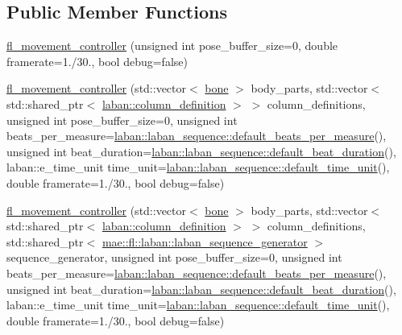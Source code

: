 \subsection*{Public Member Functions}
\begin{DoxyCompactItemize}
\item 
\hyperlink{classmae_1_1fl_1_1fl__movement__controller_ab2be7883de1d85c282720633014e3ca2}{fl\-\_\-movement\-\_\-controller} (unsigned int pose\-\_\-buffer\-\_\-size=0, double framerate=1./30., bool debug=false)
\item 
\hyperlink{classmae_1_1fl_1_1fl__movement__controller_ac72d3642ed9580a6d0b2364aac1c75e4}{fl\-\_\-movement\-\_\-controller} (std\-::vector$<$ \hyperlink{classmae_1_1bone}{bone} $>$ body\-\_\-parts, std\-::vector$<$ std\-::shared\-\_\-ptr$<$ \hyperlink{classmae_1_1fl_1_1laban_1_1column__definition}{laban\-::column\-\_\-definition} $>$ $>$ column\-\_\-definitions, unsigned int pose\-\_\-buffer\-\_\-size=0, unsigned int beats\-\_\-per\-\_\-measure=\hyperlink{classmae_1_1fl_1_1laban_1_1laban__sequence_a2e64362d5cfeb89eb8545cb064e63170}{laban\-::laban\-\_\-sequence\-::default\-\_\-beats\-\_\-per\-\_\-measure}(), unsigned int beat\-\_\-duration=\hyperlink{classmae_1_1fl_1_1laban_1_1laban__sequence_ac7bf04cdac0c3aed6b8ee4a887e561d9}{laban\-::laban\-\_\-sequence\-::default\-\_\-beat\-\_\-duration}(), laban\-::e\-\_\-time\-\_\-unit time\-\_\-unit=\hyperlink{classmae_1_1fl_1_1laban_1_1laban__sequence_ada28215d43d85e983fe6129e9816eed2}{laban\-::laban\-\_\-sequence\-::default\-\_\-time\-\_\-unit}(), double framerate=1./30., bool debug=false)
\item 
\hyperlink{classmae_1_1fl_1_1fl__movement__controller_a98b3787f9a66bddd9296b05bc44d530d}{fl\-\_\-movement\-\_\-controller} (std\-::vector$<$ \hyperlink{classmae_1_1bone}{bone} $>$ body\-\_\-parts, std\-::vector$<$ std\-::shared\-\_\-ptr$<$ \hyperlink{classmae_1_1fl_1_1laban_1_1column__definition}{laban\-::column\-\_\-definition} $>$ $>$ column\-\_\-definitions, std\-::shared\-\_\-ptr$<$ \hyperlink{classmae_1_1fl_1_1laban_1_1laban__sequence__generator}{mae\-::fl\-::laban\-::laban\-\_\-sequence\-\_\-generator} $>$ sequence\-\_\-generator, unsigned int pose\-\_\-buffer\-\_\-size=0, unsigned int beats\-\_\-per\-\_\-measure=\hyperlink{classmae_1_1fl_1_1laban_1_1laban__sequence_a2e64362d5cfeb89eb8545cb064e63170}{laban\-::laban\-\_\-sequence\-::default\-\_\-beats\-\_\-per\-\_\-measure}(), unsigned int beat\-\_\-duration=\hyperlink{classmae_1_1fl_1_1laban_1_1laban__sequence_ac7bf04cdac0c3aed6b8ee4a887e561d9}{laban\-::laban\-\_\-sequence\-::default\-\_\-beat\-\_\-duration}(), laban\-::e\-\_\-time\-\_\-unit time\-\_\-unit=\hyperlink{classmae_1_1fl_1_1laban_1_1laban__sequence_ada28215d43d85e983fe6129e9816eed2}{laban\-::laban\-\_\-sequence\-::default\-\_\-time\-\_\-unit}(), double framerate=1./30., bool debug=false)

\end{DoxyCompactItemize}
